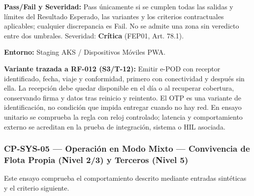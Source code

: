 \par\noindent\textbf{Pass/Fail y Severidad:} Pass únicamente si se cumplen todas las salidas y límites del Resultado Esperado, las variantes y los criterios contractuales aplicables; cualquier discrepancia es Fail. No se admite una zona sin veredicto entre dos umbrales. Severidad: \textbf{Crítica} (FEP01, Art. 78.1).\par
\par\noindent\textbf{Entorno:} Staging AKS / Dispositivos Móviles PWA.\par







\par\noindent\textbf{Variante trazada a RF-012 (S3/T-12):} Emitir e-POD con receptor identificado, fecha, viaje y conformidad, primero con conectividad y después sin ella. La recepción debe quedar disponible en el día o al recuperar cobertura, conservando firma y datos tras reinicio y reintento. El OTP es una variante de identificación, no condición que impida entregar cuando no hay red. En ensayo unitario se comprueba la regla con reloj controlado; latencia y comportamiento externo se acreditan en la prueba de integración, sistema o HIL asociada.\par
\subsubsection*{CP-SYS-05 — Operación en Modo Mixto — Convivencia de Flota Propia (Nivel 2/3) y Terceros (Nivel 5)}\label{sec:9-cp-sys-05}

Este ensayo comprueba el comportamiento descrito mediante entradas sintéticas y el criterio siguiente.

